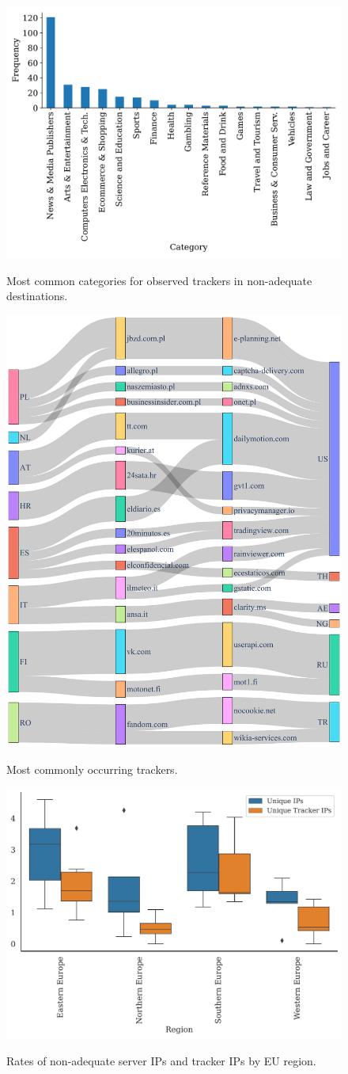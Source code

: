 \begin{center}
\begin{figure}
    \centering
    \includegraphics[width=.46\textwidth]{figures/bar-plot-category.pdf}\\
    \caption{Most common categories for observed trackers in non-adequate destinations.}
\label{fig:categories}
\end{figure}
\end{center}


\begin{center}
\begin{figure}
    \centering
    \includegraphics[width=.46\textwidth]{figures/full-flow-no-first-party-alteast-5-pairs.pdf}\\
    \caption{Most commonly occurring trackers.}
\label{fig:flowcmmntrk}
\end{figure}
\end{center}


\begin{center}
\begin{figure}
    \centering
    \includegraphics[width=.46\textwidth]{figures/boxplot.pdf}\\
    \caption{Rates of non-adequate server IPs and tracker IPs by EU region.}
\label{fig:regional}
\end{figure}
\end{center}
